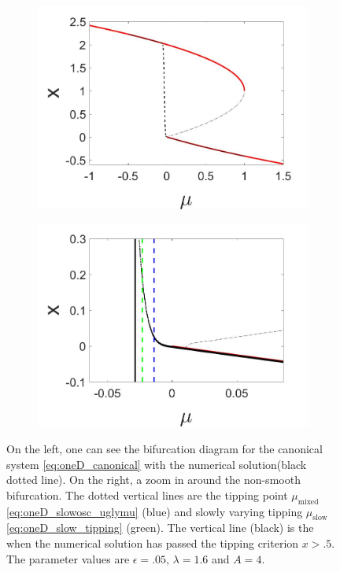 \begin{figure}[H]
\centering
\begin{subfigure}{.5\textwidth}
 \centering
 \includegraphics[width=\linewidth]{oneD/slowosc_bif_diagram_large.jpg}
 \caption{}
\end{subfigure}%
\begin{subfigure}{.5\textwidth}
 \centering
 \includegraphics[width=\linewidth]{oneD/slowosc_bif_diagram_large_zoom.jpg}
 \caption{}
\end{subfigure}
\caption{On the left, one can see the bifurcation diagram for the canonical system \eqref{eq:oneD_canonical} with the numerical solution(black dotted line). On the right, a zoom in around the non-smooth bifurcation. The dotted vertical lines are the tipping point $\mu_{\text{mixed}}$ \eqref{eq:oneD_slowosc_uglymu} (blue) and slowly varying tipping $\mu_{\text{slow}}$ \eqref{eq:oneD_slow_tipping} (green). The vertical line (black) is the when the numerical solution has passed the tipping criterion $x>.5$. The parameter values are $\epsilon=.05$, $\lambda=1.6$ and $A=4$.}
\label{fig:oneD_slowosc_numerical_large}
\end{figure}

